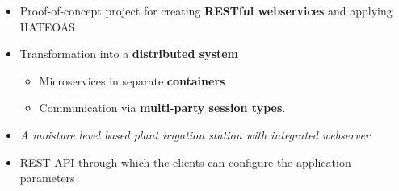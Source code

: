 

% 
% 
% 
% 
% 
% 






\begin{itemize}

\item Proof-of-concept project for creating \textbf{RESTful webservices} and applying HATEOAS

\item Transformation into a \textbf{distributed system}

\begin{itemize}
 \item Microservices in separate \textbf{containers}
 \item Communication via \textbf{multi-party session types}.
\end{itemize}

\end{itemize}

\begin{footnotesize}
\end{footnotesize}


\divider





\begin{itemize}

\item \textit{A moisture level based plant irigation station with integrated webserver}

\item REST API through which the clients can configure the application parameters

\end{itemize}

